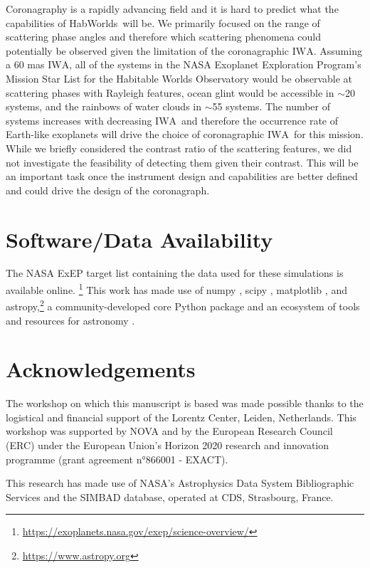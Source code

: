 \documentclass[
    usenatbib,
]{mnras}
\newcommand{\IWA}{\ensuremath{\mathrm{IWA}}}
\newcommand{\hwo}{HabWorlds}
\begin{document}
Coronagraphy is a rapidly advancing field and it is hard to predict what the capabilities of \hwo\ will be.
%
We primarily focused on the range of scattering phase angles and therefore which scattering phenomena could potentially be observed given the limitation of the coronagraphic \IWA.
%
Assuming a 60 mas \IWA, all of the systems in the NASA Exoplanet Exploration Program's Mission Star List for the Habitable Worlds Observatory would be observable at scattering phases with Rayleigh features, ocean glint would be accessible in $\sim$20 systems, and the rainbows of water clouds in $\sim$55 systems. 
%
The number of systems increases with decreasing \IWA\ and therefore the occurrence rate of Earth-like exoplanets will drive the choice of coronagraphic \IWA\ for this mission.
%
While we briefly considered the contrast ratio of the scattering features, we did not investigate the feasibility of detecting them given their contrast. 
%
This will be an important task once the instrument design and capabilities are better defined and could drive the design of the coronagraph. 


\section*{Software/Data Availability}

The NASA ExEP target list containing the data used for these simulations is available online.%
\footnote{\url{https://exoplanets.nasa.gov/exep/science-overview/}}
This work has made use of \textsf{numpy}
 \citep{NumPy2020}, \textsf{scipy} \citep{scipy_2020}, \textsf{matplotlib} \citep{matplotlib2007}, and \textsf{astropy},\footnote{\url{https://www.astropy.org}} a community-developed core Python package and an ecosystem of tools and resources for astronomy \citep{astropy:2013, astropy:2018, astropy:2022}.




\section*{Acknowledgements}
The workshop on which this manuscript is based was made possible thanks to the logistical and financial support of the Lorentz Center, Leiden, Netherlands. This workshop was supported by NOVA  and by the European Research Council (ERC) under the European Union's Horizon 2020 research and innovation programme (grant agreement n°866001 - EXACT).

This research has made use of NASA's Astrophysics Data System Bibliographic Services and the SIMBAD database, operated at CDS, Strasbourg, France. 
\end{document}
